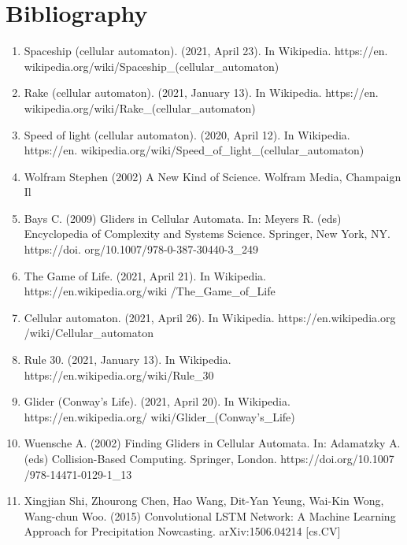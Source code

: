 \documentclass[12pt]{article}
\numberwithin{figure}{section} %
\begin{document}
\iffalse
\newpage
\section{Bibliography}
\begin{enumerate}[topsep=0pt,itemsep=-1ex,partopsep=1ex,parsep=1ex]
\item Spaceship (cellular automaton). (2021, April 23). In Wikipedia. https://en.\linebreak
wikipedia.org/wiki/Spaceship\_(cellular\_automaton)
\item Rake (cellular automaton). (2021, January 13). In Wikipedia. https://en.\linebreak
wikipedia.org/wiki/Rake\_(cellular\_automaton)
\item Speed of light (cellular automaton). (2020, April 12). In Wikipedia. https://en.\linebreak
wikipedia.org/wiki/Speed\_of\_light\_(cellular\_automaton)
\item Wolfram Stephen (2002) A New Kind of Science. Wolfram Media, Champaign Il
\item Bays C. (2009) Gliders in Cellular Automata. In: Meyers R. (eds) Encyclopedia of Complexity and Systems Science. Springer, New York, NY. 
https://doi.\linebreak
org/10.1007/978-0-387-30440-3\_249
\item The Game of Life. (2021, April 21). In Wikipedia. 
https://en.wikipedia.org/wiki\linebreak
/The\_Game\_of\_Life
\item Cellular automaton. (2021, April 26). In Wikipedia. 
https://en.wikipedia.org\linebreak
/wiki/Cellular\_automaton
\item Rule 30. (2021, January 13). In Wikipedia. 
https://en.wikipedia.org/wiki/Rule\_30
\item Glider (Conway’s Life). (2021, April 20). In Wikipedia. 
https://en.wikipedia.org/\linebreak
wiki/Glider\_(Conway’s\_Life)
\item Wuensche A. (2002) Finding Gliders in Cellular Automata. In: Adamatzky A. (eds) Collision-Based Computing. Springer, London. 
https://doi.org/10.1007\linebreak
/978-14471-0129-1\_13
\item Xingjian Shi, Zhourong Chen, Hao Wang, Dit-Yan Yeung, Wai-Kin Wong, Wang-chun Woo. (2015) Convolutional LSTM Network: A Machine Learning Approach for Precipitation Nowcasting. arXiv:1506.04214 [cs.CV]

\end{enumerate}
\end{document}
